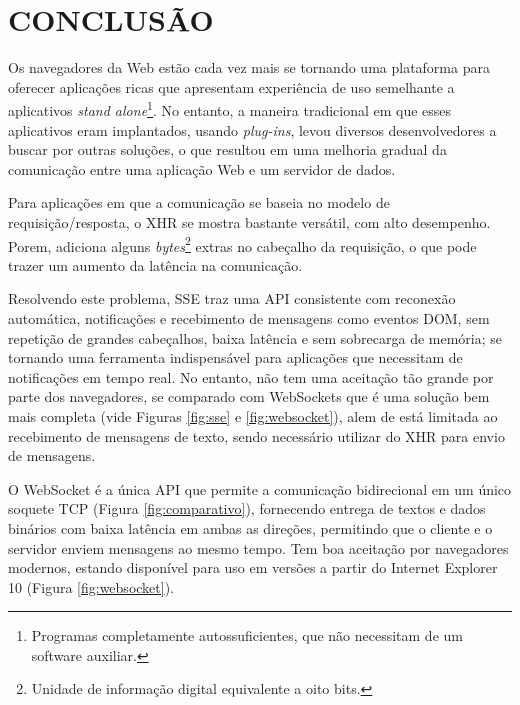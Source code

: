 \section{CONCLUSÃO}



Os navegadores da Web estão cada vez mais se tornando uma plataforma para oferecer aplicações ricas que apresentam experiência de uso semelhante a aplicativos \emph{stand alone}\footnote{Programas completamente autossuficientes, que não necessitam de um software auxiliar.}. No entanto, a maneira tradicional em que esses aplicativos eram implantados, usando \emph{plug-ins}, levou diversos desenvolvedores a buscar por outras soluções, o que resultou em uma melhoria gradual da comunicação entre uma aplicação Web e um servidor de dados.

Para aplicações em que a comunicação se baseia no modelo de requisição/resposta, o XHR se mostra bastante versátil, com alto desempenho. Porem, adiciona alguns \emph{bytes}\footnote{Unidade de informação digital equivalente a oito bits.}  extras no cabeçalho da requisição, o que pode trazer um aumento da latência na comunicação.

Resolvendo este problema, SSE traz uma API consistente com reconexão automática, notificações e recebimento de mensagens como eventos DOM, sem repetição de grandes cabeçalhos, baixa latência e sem sobrecarga de memória; se tornando uma ferramenta indispensável para aplicações que necessitam de notificações em tempo real. No entanto, não tem uma aceitação tão grande por parte dos navegadores, se comparado com WebSockets que é uma solução bem mais completa (vide Figuras \ref{fig:sse} e \ref{fig:websocket}), alem de está limitada ao recebimento de mensagens de texto, sendo necessário utilizar do XHR para envio de mensagens.

O WebSocket é a única API que permite a comunicação bidirecional em um único soquete TCP (Figura \ref{fig:comparativo}),  fornecendo entrega de textos e dados binários com baixa latência em ambas as direções, permitindo que o cliente e o servidor enviem mensagens ao mesmo tempo. Tem boa aceitação por navegadores modernos, estando disponível para uso em versões a partir do Internet Explorer 10 (Figura \ref{fig:websocket}).

